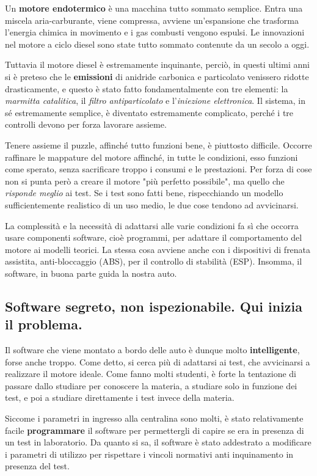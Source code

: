 \documentclass[a4paper, 12pt]{extarticle}
\begin{document}
Un \textbf{motore endotermico} è una macchina tutto sommato semplice.
Entra una miscela aria-carburante, viene compressa, avviene
un'espansione che trasforma l'energia chimica in movimento e i gas
combusti vengono espulsi. Le innovazioni nel motore a ciclo diesel sono
state tutto sommato contenute da un secolo a oggi.

Tuttavia il motore diesel è estremamente inquinante, perciò, in questi
ultimi anni si è preteso che le \textbf{emissioni} di anidride
carbonica e particolato venissero ridotte drasticamente, e questo è
stato fatto fondamentalmente con tre elementi: la \textit{marmitta
catalitica}, il \textit{filtro antiparticolato} e l'\textit{iniezione
elettronica}. Il sistema, in sé estremamente semplice, è diventato
estremamente complicato, perché i tre controlli devono per forza
lavorare assieme.

Tenere assieme il puzzle, affinché tutto funzioni bene, è piuttosto
difficile. Occorre raffinare le mappature del motore affinché, in tutte
le condizioni, esso funzioni come sperato, senza sacrificare troppo i
consumi e le prestazioni. Per forza di cose non si punta però a
creare il motore "più perfetto possibile", ma quello che
\textit{risponde meglio} ai test. Se i test sono fatti bene,
rispecchiando un modello sufficientemente realistico di un uso medio,
le due cose tendono ad avvicinarsi.

La complessità e la necessità di adattarsi alle varie condizioni fa sì
che occorra usare componenti software, cioè programmi, per adattare il
comportamento del motore ai modelli teorici. La stessa cosa avviene
anche con i dispositivi di frenata assistita, anti-bloccaggio (ABS),
per il controllo di stabilità (ESP). Insomma, il software, in buona
parte guida la nostra auto.

\subsection*{Software segreto, non ispezionabile. Qui inizia il problema.}

Il software che viene montato a bordo delle auto è dunque molto
\textbf{intelligente}, forse anche troppo. Come detto, si cerca più di
adattarsi ai test, che avvicinarsi a realizzare il motore ideale.
Come fanno molti studenti, è forte la tentazione di passare dallo
studiare per conoscere la materia, a studiare solo in funzione dei
test, e poi a studiare direttamente i test invece della materia.

Siccome i parametri in ingresso alla centralina sono molti, è stato
relativamente facile \textbf{programmare} il software per permettergli
di capire se era in presenza di un test in laboratorio. Da quanto si
sa, il software è stato addestrato a modificare i parametri di utilizzo
per rispettare i vincoli normativi anti inquinamento in presenza del
test.
\end{document}
